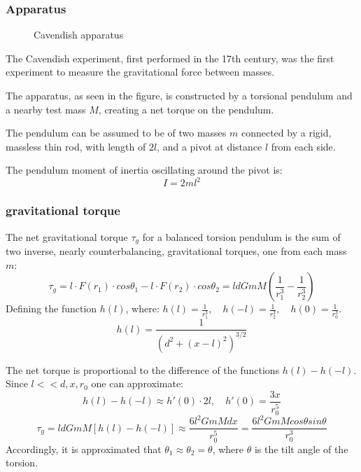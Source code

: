 \documentclass[\main/master.tex]{subfiles}
\begin{document}
\subsubsection{Apparatus}
\begin{figure}[htbp]
	\centering
	\caption[Cavendish apparatus]{Cavendish apparatus \cite{howell2019}}
	\label{fig:Cavendish apparatus}
\end{figure}
\par\noindent
The Cavendish experiment, first performed in the 17th century, was the first experiment to measure the gravitational force between masses. 
\par\noindent
The apparatus, as seen in the figure, is constructed by a torsional pendulum and a nearby test mass $M$, creating a net torque on the pendulum. 
\par\noindent
The pendulum can be assumed to be of two masses $m$ connected by a rigid, massless thin rod, with length of $2l$, and a pivot at distance $l$ from each side.
\par\noindent
The pendulum moment of inertia oscillating around the pivot is:
\begin{equation}
I = 2ml^2     \label{eqn:moment_inertia}
\end{equation} 

\subsubsection{gravitational torque}
The net gravitational torque $\tau_g$ for a balanced torsion pendulum is the sum of two inverse, nearly counterbalancing, gravitational torques, one from each mass $m$:
\begin{equation}
\tau_g = l \cdot F(r_1) \cdot cos\theta_1 - l \cdot F(r_2) \cdot cos\theta_2 = l d GmM(\frac{1}{r_1^3} - \frac{1}{r_2^3})     \label{eqn:gravitation_torque}
\end{equation}
Defining the function $h(l)$, where: $h(l) = \frac{1}{r_1^3},\quad	h(-l) = \frac{1}{r_2^3},\quad	h(0) = \frac{1}{r_0^3}$.
\begin{equation}
h(l) = \frac{1}{(d^2 +(x-l)^2)^{3/2}} \label{eqn:gravitation_torque}
\end{equation}
\par\noindent
The net torque is proportional to the difference of the functions $h(l)-h(-l)$. Since $l<<d,x,r_0$ one can approximate:
\begin{equation}
h(l)-h(-l)\approx h'(0)\cdot 2l,\quad h'(0) = \frac{3x}{r_0^5}\label{eqn:approximation}
\end{equation}
\begin{equation}
\tau_g = l d GmM[h(l)-h(-l)]\approx \frac{6l^2GmMdx} {r_0^5} = \frac{6l^2GmMcos\theta sin\theta}{r_0^3}      \label{eqn:gravitation_torque}
\end{equation}
Accordingly, it is approximated that $\theta_1 \approx \theta_2 = \theta$, where $\theta$ is the tilt angle of the torsion.
\end{document}
